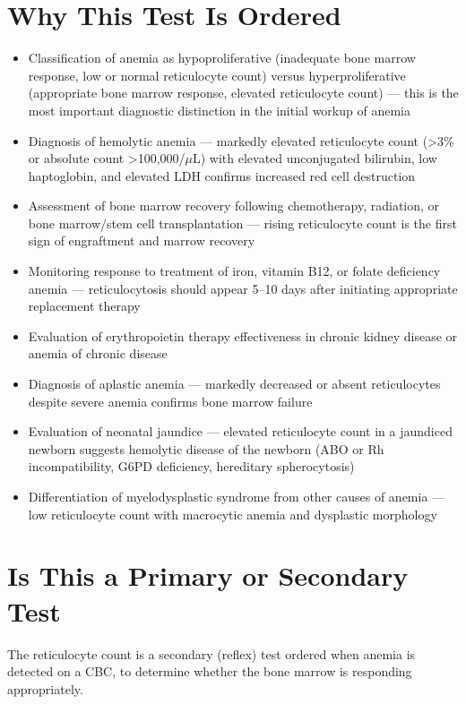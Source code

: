 \section*{Why This Test Is Ordered}
\begin{itemize}
  \item Classification of anemia as hypoproliferative (inadequate bone marrow response, low or normal reticulocyte count) versus hyperproliferative (appropriate bone marrow response, elevated reticulocyte count) --- this is the most important diagnostic distinction in the initial workup of anemia
  \item Diagnosis of hemolytic anemia --- markedly elevated reticulocyte count (>3\% or absolute count >100,000/$\mu$L) with elevated unconjugated bilirubin, low haptoglobin, and elevated LDH confirms increased red cell destruction
  \item Assessment of bone marrow recovery following chemotherapy, radiation, or bone marrow/stem cell transplantation --- rising reticulocyte count is the first sign of engraftment and marrow recovery
  \item Monitoring response to treatment of iron, vitamin B12, or folate deficiency anemia --- reticulocytosis should appear 5--10 days after initiating appropriate replacement therapy
  \item Evaluation of erythropoietin therapy effectiveness in chronic kidney disease or anemia of chronic disease
  \item Diagnosis of aplastic anemia --- markedly decreased or absent reticulocytes despite severe anemia confirms bone marrow failure
  \item Evaluation of neonatal jaundice --- elevated reticulocyte count in a jaundiced newborn suggests hemolytic disease of the newborn (ABO or Rh incompatibility, G6PD deficiency, hereditary spherocytosis)
  \item Differentiation of myelodysplastic syndrome from other causes of anemia --- low reticulocyte count with macrocytic anemia and dysplastic morphology
\end{itemize}

\section*{Is This a Primary or Secondary Test}
The reticulocyte count is a secondary (reflex) test ordered when anemia is detected on a CBC, to determine whether the bone marrow is responding appropriately.

